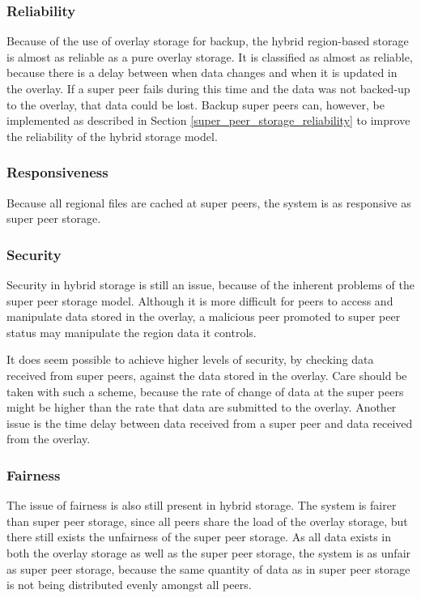 \subsubsection{Reliability}
\label{hybrid_storage_reliability}

Because of the use of overlay storage for backup, the hybrid region-based storage is almost as reliable as a pure overlay storage. It is classified as almost as reliable, because there is a delay between when data changes and when it is updated in the overlay. If a super peer fails during this time and the data was not backed-up to the overlay, that data could be lost. Backup super peers can, however, be implemented as described in Section
\ref{super_peer_storage_reliability} to improve the reliability of the hybrid storage model.

\subsubsection{Responsiveness}

Because all regional files are cached at super peers, the system is as responsive as super peer storage.

\subsubsection{Security}

Security in hybrid storage is still an issue, because of the inherent problems of the super peer storage model. Although it is more difficult for peers to access and manipulate data stored in the overlay, a malicious peer promoted to super peer status may manipulate the region data it controls.

It does seem possible to achieve higher levels of security, by checking data received from super peers, against the data stored in the overlay. Care should be taken with such a scheme, because the rate of change of data at the super peers might be higher than the rate that data are submitted to the overlay. Another issue is the time delay between data received from a super peer and data received from the overlay.

\subsubsection{Fairness}

The issue of fairness is also still present in hybrid storage. The system is fairer than super peer storage, since all peers share the load of the overlay storage, but there still exists the unfairness of the super peer storage. As all data exists in both the overlay storage as well as the super peer storage, the system is as unfair as super peer storage, because the same quantity of data as in super peer storage is not being distributed evenly amongst all peers.

